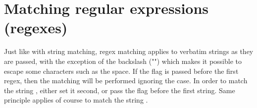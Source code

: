 
\section{Matching regular expressions (regexes)}

Just like with string matching, regex matching applies to verbatim strings as
they are passed, with the exception of the backslash ("\bslash ") which makes it
possible to escape some characters such as the space. If the  flag is
passed before the first regex, then the matching will be performed ignoring
the case. In order to match the string , either set it second, or pass
the \cmdarg{--} flag before the first string. Same principle applies of course to
match the string \cmdarg{--}.

